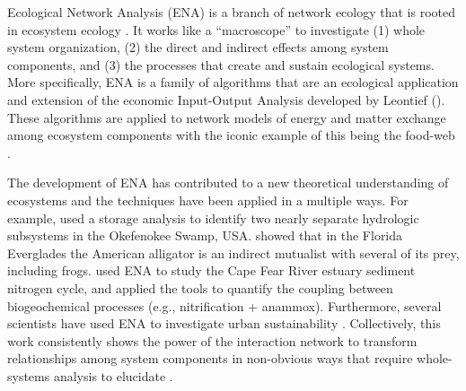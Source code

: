 \documentclass[11pt]{article}
\begin{document}
\begin{spacing}{2}
Ecological Network Analysis (ENA) is a branch of network ecology that
is rooted in ecosystem ecology \citep{borrett12_netecol}.  It works
like a ``macroscope'' to investigate (1) whole system organization,
(2) the direct and indirect effects among system components, and (3)
the processes that create and sustain ecological systems.  More
specifically, ENA is a family of algorithms that are an ecological
application and extension of the economic Input-Output Analysis
developed by Leontief (\citeyear{leontief66}).  These algorithms are
applied to network models of energy and matter exchange among
ecosystem components with the iconic example of this being the
food-web \citep{patten76, ulanowicz86, fath99_review, hannon73}.


The development of ENA has contributed to a new theoretical
understanding of ecosystems \citep{ulanowicz86, higashi91, belgrano05,
  jorgensen07_newecology} and the techniques have been applied in a
multiple ways.  For example, \citet{patten82} used a storage analysis
to identify two nearly separate hydrologic subsystems in the
Okefenokee Swamp, USA.  \citet{bondavalli99} showed that in the
Florida Everglades the American alligator is an indirect mutualist
with several of its prey, including frogs.  \citet{hines12} used
ENA to study the Cape Fear River estuary sediment nitrogen cycle, and applied
the tools to quantify the coupling between biogeochemical processes
(e.g., nitrification + anammox).  
Furthermore, several scientists have used ENA to investigate urban
sustainability \citep{bodini02, zhang10_ecomod, chen12,
  bodini2012cities}.  Collectively, this work consistently shows the
power of the interaction network to transform relationships among
system components in non-obvious ways that require whole-systems
analysis to elucidate \citep{ulanowicz90, patten91,
  fath07_netconstruction}.



\end{spacing}
\end{document}
